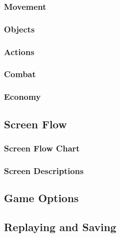 \documentclass[12pt,titlepage]{article}
\begin{document}
\subsubsection{Movement}

\subsubsection{Objects}

\subsubsection{Actions}

\subsubsection{Combat}

\subsubsection{Economy}

\subsection{Screen Flow}

\subsubsection{Screen Flow Chart}

\subsubsection{Screen Descriptions}
%

\subsection{Game Options}

\subsection{Replaying and Saving}
\end{document}
